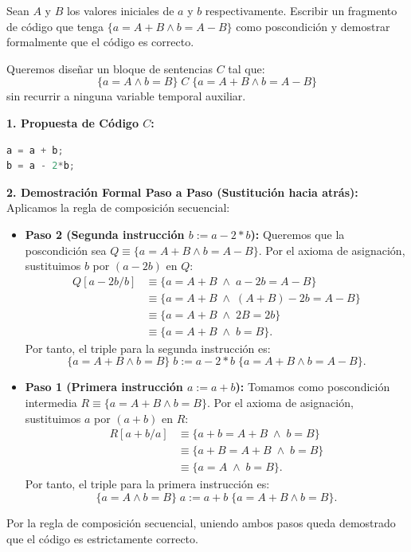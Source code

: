 \begin{ejercicio}
Sean $A$ y $B$ los valores iniciales de $a$ y $b$ respectivamente. Escribir un fragmento de código que tenga $\{a = A + B \land b = A - B\}$ como poscondición y demostrar formalmente que el código es correcto.
\end{ejercicio}

\begin{solucion}
Queremos diseñar un bloque de sentencias $C$ tal que:
\[
\{a = A \land b = B\} \; C \; \{a = A + B \land b = A - B\}
\]
sin recurrir a ninguna variable temporal auxiliar.

\textbf{1. Propuesta de Código $C$:}
\begin{lstlisting}[language=C++]
a = a + b;
b = a - 2*b;
\end{lstlisting}

\textbf{2. Demostración Formal Paso a Paso (Sustitución hacia atrás):}
Aplicamos la regla de composición secuencial:

\begin{itemize}[leftmargin=*]
    \item \textbf{Paso 2 (Segunda instrucción $b := a - 2*b$):}
    Queremos que la poscondición sea $Q \equiv \{a = A + B \land b = A - B\}$.
    Por el axioma de asignación, sustituimos $b$ por $(a - 2b)$ en $Q$:
    \begin{align*}
    Q[a - 2b / b] &\equiv \{a = A + B \;\land\; a - 2b = A - B\} \\
    &\equiv \{a = A + B \;\land\; (A + B) - 2b = A - B\} \\
    &\equiv \{a = A + B \;\land\; 2B = 2b\} \\
    &\equiv \{a = A + B \;\land\; b = B\}.
    \end{align*}
    Por tanto, el triple para la segunda instrucción es:
    \[
    \{a = A + B \land b = B\} \; b := a - 2*b \; \{a = A + B \land b = A - B\}.
    \]

    \item \textbf{Paso 1 (Primera instrucción $a := a + b$):}
    Tomamos como poscondición intermedia $R \equiv \{a = A + B \land b = B\}$.
    Por el axioma de asignación, sustituimos $a$ por $(a + b)$ en $R$:
    \begin{align*}
    R[a + b / a] &\equiv \{a + b = A + B \;\land\; b = B\} \\
    &\equiv \{a + B = A + B \;\land\; b = B\} \\
    &\equiv \{a = A \;\land\; b = B\}.
    \end{align*}
    Por tanto, el triple para la primera instrucción es:
    \[
    \{a = A \land b = B\} \; a := a + b \; \{a = A + B \land b = B\}.
    \]
\end{itemize}

Por la regla de composición secuencial, uniendo ambos pasos queda demostrado que el código es estrictamente correcto.
\end{solucion}

